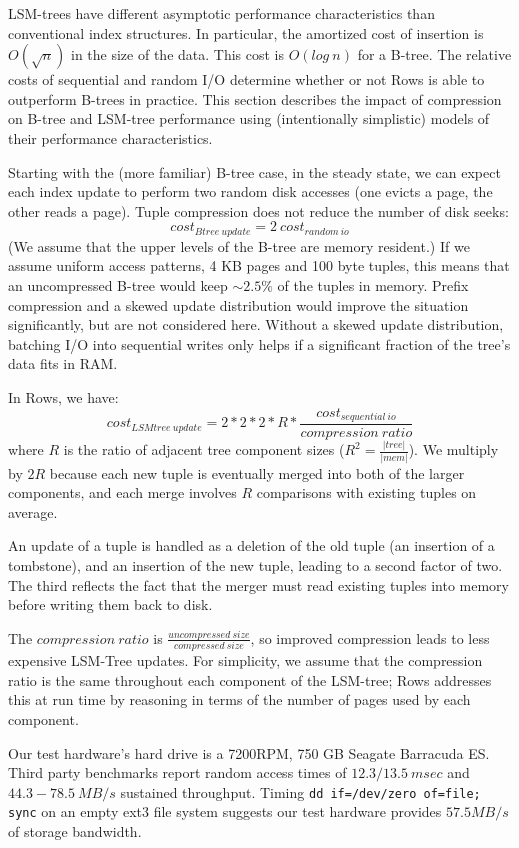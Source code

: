 \documentclass{sig-alternate-sigmod08}
\newcommand{\rows}{Rows\xspace}
\begin{document}
LSM-trees have different asymptotic performance characteristics than
conventional index structures.  In particular, the amortized cost of
insertion is $O(\sqrt{n})$ in the size of the data.  This cost is
$O(log~n)$ for a B-tree.  The relative costs of sequential and random
I/O determine whether or not \rows is able to outperform B-trees in
practice.  This section describes the impact of compression on B-tree
and LSM-tree performance using (intentionally simplistic) models of
their performance characteristics.

Starting with the (more familiar) B-tree case, in the steady state, we
can expect each index update to perform two random disk accesses (one
evicts a page, the other reads a page).  Tuple compression does not
reduce the number of disk seeks:
\[
   cost_{Btree~update}=2~cost_{random~io}
\]
(We assume that the upper levels of the B-tree are memory resident.)  If
we assume uniform access patterns, 4 KB pages and 100 byte tuples,
this means that an uncompressed B-tree would keep $\sim2.5\%$ of the
tuples in memory.  Prefix compression and a skewed update distribution
would improve the situation significantly, but are not considered
here.  Without a skewed update distribution, batching I/O into
sequential writes only helps if a significant fraction of the tree's
data fits in RAM.

In \rows, we have:
\[
   cost_{LSMtree~update}=2*2*2*R*\frac{cost_{sequential~io}}{compression~ratio}  %
\]
where $R$ is the ratio of adjacent tree component sizes
($R^2=\frac{|tree|}{|mem|}$).  We multiply by $2R$ because each new
tuple is eventually merged into both of the larger components, and
each merge involves $R$ comparisons with existing tuples on average.

An update of a tuple is handled as a deletion of the old tuple (an
insertion of a tombstone), and an insertion of the new tuple, leading
to a second factor of two.  The third reflects the fact that the
merger must read existing tuples into memory before writing them back
to disk.

The $compression~ratio$ is
$\frac{uncompressed~size}{compressed~size}$, so improved compression
leads to less expensive LSM-Tree updates.  For simplicity, we assume
that the compression ratio is the same throughout each component of
the LSM-tree; \rows addresses this at run time by reasoning in terms
of the number of pages used by each component.

Our test hardware's hard drive is a 7200RPM, 750 GB Seagate Barracuda
ES.  
Third party
benchmarks\cite{hdBench} %
report random access times of $12.3/13.5~msec$ and $44.3-78.5~MB/s$
sustained throughput.  Timing {\tt dd if=/dev/zero of=file; sync} on an
empty ext3 file system suggests our test hardware provides $57.5MB/s$ of
storage bandwidth.
\end{document}
